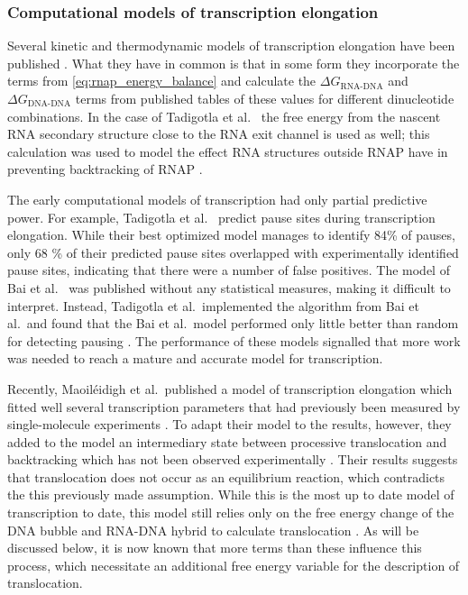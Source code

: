 \subsubsection{Computational models of transcription elongation}
Several kinetic and thermodynamic models of transcription elongation have been
published \cite{tadigotla_thermodynamic_2006, bai_sequence-dependent_2004,
guajardo_model_1997, yager_thermodynamic_1991}. What they have in common is
that in some form they incorporate the terms from
\eqref{eq:rnap_energy_balance} and calculate the $\Delta G_{\text{RNA-DNA}}$
and $\Delta G_{\text{DNA-DNA}}$ terms from published tables of these values
for different dinucleotide combinations. In the case of Tadigotla et al.\
\cite{tadigotla_thermodynamic_2006} the free energy from the nascent RNA
secondary structure close to the RNA exit channel is used as well; this
calculation was used to model the effect RNA structures outside RNAP have in
preventing backtracking of RNAP \cite{zamft_nascent_2012}.

The early computational models of transcription had only partial predictive
power. For example, Tadigotla et al.\ \cite{tadigotla_thermodynamic_2006}
predict pause sites during transcription elongation. While their best optimized
model manages to identify 84\% of pauses, only 68 \% of their predicted pause
sites overlapped with experimentally identified pause sites, indicating that
there were a number of false positives. The model of Bai et al.\
\cite{bai_mechanochemical_2007} was published without any statistical
measures, making it difficult to interpret. Instead, Tadigotla et al.\
implemented the algorithm from Bai et al.\ and found that the Bai et al.\
model performed only little better than random for detecting pausing
\cite{tadigotla_thermodynamic_2006}. The performance of these models signalled
that more work was needed to reach a mature and accurate model for
transcription.

Recently, Maoiléidigh et al.\ published a model of transcription elongation
which fitted well several transcription parameters that had previously been
measured by single-molecule experiments \cite{o_maoileidigh_unified_2011}. To
adapt their model to the results, however, they added to the model an
intermediary state between processive translocation and backtracking which has
not been observed experimentally \cite{o_maoileidigh_unified_2011}. Their
results suggests that translocation does not occur as an equilibrium reaction,
which contradicts the this previously made assumption. While this is the most
up to date model of transcription to date, this model still relies only on the
free energy change of the DNA bubble and RNA-DNA hybrid to calculate
translocation \cite{o_maoileidigh_unified_2011}. As will be discussed below, it
is now known that more terms than these influence this process, which
necessitate an additional free energy variable for the description of
translocation.

